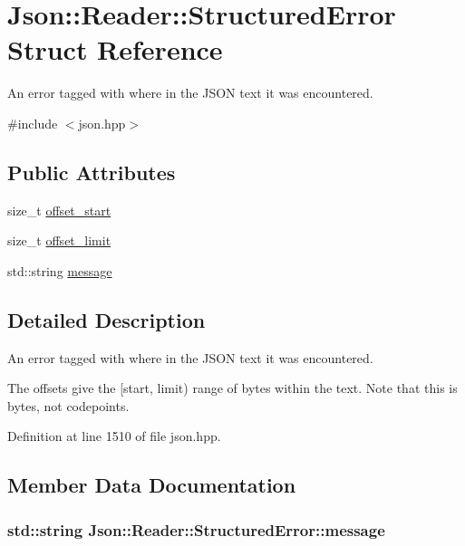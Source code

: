 \hypertarget{struct_json_1_1_reader_1_1_structured_error}{\section{Json\-:\-:Reader\-:\-:Structured\-Error Struct Reference}
\label{struct_json_1_1_reader_1_1_structured_error}
}


An error tagged with where in the J\-S\-O\-N text it was encountered.  




{\ttfamily \#include $<$json.\-hpp$>$}

\subsection*{Public Attributes}
\begin{DoxyCompactItemize}
\item 
size\-\_\-t \hyperlink{struct_json_1_1_reader_1_1_structured_error_a160dae4eb3464a2209b743c755baf65f}{offset\-\_\-start}
\item 
size\-\_\-t \hyperlink{struct_json_1_1_reader_1_1_structured_error_a80747dae744bcc80a9bc81c94fd42e13}{offset\-\_\-limit}
\item 
std\-::string \hyperlink{struct_json_1_1_reader_1_1_structured_error_ab8755e5201b78c6ae077338f8819e6e6}{message}
\end{DoxyCompactItemize}


\subsection{Detailed Description}
An error tagged with where in the J\-S\-O\-N text it was encountered. 

The offsets give the \mbox{[}start, limit) range of bytes within the text. Note that this is bytes, not codepoints. 

Definition at line 1510 of file json.\-hpp.



\subsection{Member Data Documentation}
\hypertarget{struct_json_1_1_reader_1_1_structured_error_ab8755e5201b78c6ae077338f8819e6e6}{
\subsubsection[{message}]{\setlength{\rightskip}{0pt plus 5cm}std\-::string Json\-::\-Reader\-::\-Structured\-Error\-::message}}\label{struct_json_1_1_reader_1_1_structured_error_ab8755e5201b78c6ae077338f8819e6e6}


